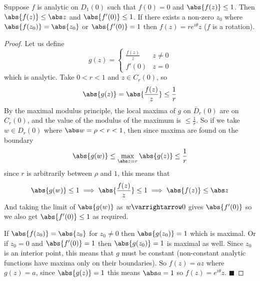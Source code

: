 \documentclass[10pt]{article}
\let\to=\varrightarrow
\def\qed{\hskip1cm\hbox{}\hfill$\blacksquare$}
\begin{document}
\begin{lemm*}

    Suppose $f$ is analytic on $D_1(0)$ such that $f(0)=0$ and $\abs{f(z)}\leq1$.
    Then $\abs{f(z)}\leq\abs z$ and $\abs{f'(0)}\leq1$.
    If there exists a non-zero $z_0$ where $\abs{f(z_0)}=\abs{z_0}$ or $\abs{f'(0)}=1$ then $f(z)=re^{i\theta}z$ ($f$ is a rotation).

\end{lemm*}

\begin{proof}

    Let us define
    \[ g(z) = \begin{cases} \frac{f(z)}z & z\neq 0 \\ f'(0) & z=0 \end{cases} \]
    which is analytic.
    Take $0<r<1$ and $z\in C_r(0)$, so
    \[ \abs{g(z)} = \abs{\frac{f(z)}z} \leq \frac1r \]
    By the maximal modulus principle, the local maxima of $g$ on $\bar D_r(0)$ are on $C_r(0)$, and the value of the modulus of the maximum is $\leq\frac1r$.
    So if we take $w\in D_r(0)$ where $\abs w=\rho<r<1$, then since maxima are found on the boundary
    \[ \abs{g(w)} \leq \max_{\abs z=r}\abs{g(z)} \leq \frac1r \]
    since $r$ is arbitrarily between $\rho$ and $1$, this means that
    \[ \abs{g(w)} \leq 1 \implies \abs{\frac{f(z)}z}\leq 1 \implies \abs{f(z)} \leq \abs z \]
    And taking the limit of $\abs{g(w)}$ as $w\to0$ gives $\abs{f'(0)}$ so we also get $\abs{f'(0)}\leq 1$ as required.

    If $\abs{f(z_0)}=\abs{z_0}$ for $z_0\neq0$ then $\abs{g(z_0)}=1$ which is maximal.
    Or if $z_0=0$ and $\abs{f'(0)}=1$ then $\abs{g(z_0)}=1$ is maximal as well.
    Since $z_0$ is an interior point, this means that $g$ must be constant (non-constant analytic functions have maxima only on their boundaries).
    So $f(z)=az$ where $g(z)=a$, since $\abs{g(z)}=1$ this means $\abs a=1$ so $f(z)=e^{i\theta}z$.
    \qed

\end{proof}
\end{document}

